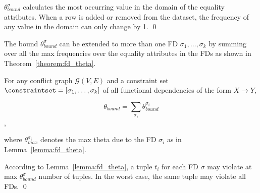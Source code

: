 \proof
$\theta_{bound}^\sigma$ calculates the most occurring value in the domain of the equality attributes. When a row is added or removed from the dataset, the frequency of any value in the domain can only change by 1. \qed

The bound $\theta_{bound}^\sigma$ can be extended to more than one FD $\sigma_1, \dots, \sigma_k$ by summing over all the max frequencies over the equality attributes in the FDs as shown in Theorem~\ref{theorem:fd_theta}.

\begin{theorem}\label{theorem:fd_theta}
    For any conflict graph $\mathcal{G} (V,E)$ and a constraint set $\constraintset = [\sigma_1, \dots, \sigma_k]$ of all functional dependencies of the form $X \rightarrow Y$, 
    
    $$ \theta_{bound} = \sum_{\sigma_i} \theta_{bound}^{\sigma_i}$$,
    
     where $\theta_{max}^{\sigma_i}$ denotes the max theta due to the FD $\sigma_i$ as in Lemma~\ref{lemma:fd_theta}.
\end{theorem}

\proof
According to Lemma~\ref{lemma:fd_theta}, a tuple $t_i$ for each FD $\sigma$ may violate at max $\theta_{bound}^\sigma$ number of tuples. In the worst case, the same tuple may violate all FDs. \qed


